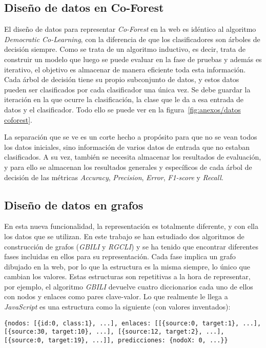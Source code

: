 \subsection{Diseño de datos en Co-Forest}
El diseño de datos para representar \textit{Co-Forest} en la web es idéntico al algoritmo \textit{Democratic Co-Learning}, con la diferencia de que los clasificadores son árboles de decisión siempre. Como se trata de un algoritmo inductivo, es decir, trata de construir un modelo que luego se puede evaluar en la fase de pruebas y además es iterativo, el objetivo es almacenar de manera eficiente toda esta información. Cada árbol de decisión tiene su propio subconjunto de datos, y estos datos pueden ser clasificados por cada clasificador una única vez. Se debe guardar la iteración en la que ocurre la clasificación, la clase que le da a esa entrada de datos y el clasificador. Todo ello se puede ver en la figura~\ref{fig:anexos/datos coforest}.


La separación que se ve es un corte hecho a propósito para que no se vean todos los datos iniciales, sino información de varios datos de entrada que no estaban clasificados.
A su vez, también se necesita almacenar los resultados de evaluación, y para ello se almacenan los resultados generales y específicos de cada árbol de decisión de las métricas \textit{Accuracy}, \textit{Precision}, \textit{Error}, \textit{F1-score} y \textit{Recall}.
\subsection{Diseño de datos en grafos}
En esta nueva funcionalidad, la representación es totalmente diferente, y con ella los datos que se utilizan. En este trabajo se han estudiado dos algoritmos de construcción de grafos (\textit{GBILI} y \textit{RGCLI}) y se ha tenido que encontrar diferentes fases incluidas en ellos para su representación. Cada fase implica un grafo dibujado en la web, por lo que la estructura es la misma siempre, lo único que cambian los valores. Estas estructuras son repetitivas a la hora de representar, por ejemplo, el algoritmo \textit{GBILI} devuelve cuatro diccionarios cada uno de ellos con nodos y enlaces como pares clave-valor. Lo que realmente le llega a \textit{JavaScript} es una estructura como la siguiente (con valores inventados): 

\texttt{\{nodos: [\{id:0, class:1\}, ...], enlaces: [[\{source:0, target:1\}, ...], [\{source:30, target:10\}, ...], [\{source:12, target:2\}, ...], [\{source:0, target:19\}, ...]], predicciones: \{nodoX: 0, ...\}\}}

